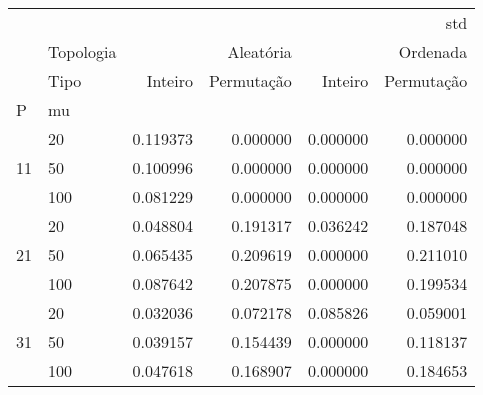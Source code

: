 \begin{tabular}{llrrrr}
\toprule
 &  & \multicolumn{4}{r}{std} \\
 & Topologia & \multicolumn{2}{r}{Aleatória} & \multicolumn{2}{r}{Ordenada} \\
 & Tipo & Inteiro & Permutação & Inteiro & Permutação \\
P & mu &  &  &  &  \\
\midrule
\multirow[t]{3}{*}{11} & 20 & 0.119373 & 0.000000 & 0.000000 & 0.000000 \\
 & 50 & 0.100996 & 0.000000 & 0.000000 & 0.000000 \\
 & 100 & 0.081229 & 0.000000 & 0.000000 & 0.000000 \\
\cline{1-6}
\multirow[t]{3}{*}{21} & 20 & 0.048804 & 0.191317 & 0.036242 & 0.187048 \\
 & 50 & 0.065435 & 0.209619 & 0.000000 & 0.211010 \\
 & 100 & 0.087642 & 0.207875 & 0.000000 & 0.199534 \\
\cline{1-6}
\multirow[t]{3}{*}{31} & 20 & 0.032036 & 0.072178 & 0.085826 & 0.059001 \\
 & 50 & 0.039157 & 0.154439 & 0.000000 & 0.118137 \\
 & 100 & 0.047618 & 0.168907 & 0.000000 & 0.184653 \\
\cline{1-6}
\bottomrule
\end{tabular}
